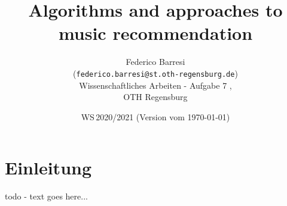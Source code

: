 \documentclass[11pt,twoside,a4paper]{article}
\begin{document}
\title{Algorithms and approaches to music recommendation}
\author{Federico Barresi \\
  (\texttt{federico.barresi@st.oth-regensburg.de})\\[5mm]
  Wissenschaftliches Arbeiten - Aufgabe 7 , \\
  OTH Regensburg
}
  
\date{WS\,2020/2021 (Version vom \today)}

\maketitle


\section{Einleitung}
todo - text goes here...\cite{Shan2009}



\end{document}
